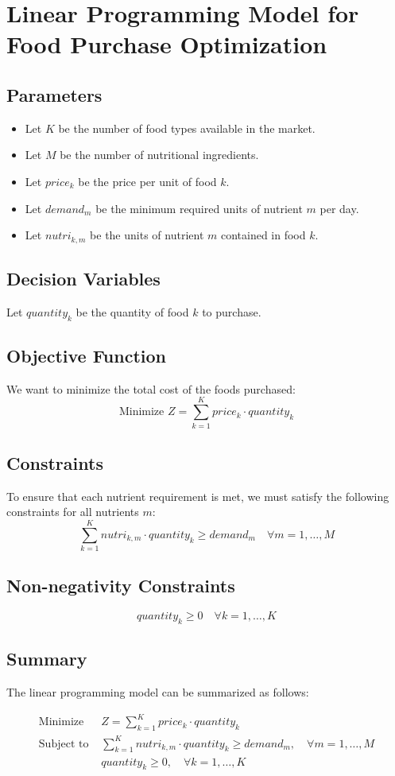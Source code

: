 \documentclass{article}
\begin{document}
\section*{Linear Programming Model for Food Purchase Optimization}

\subsection*{Parameters}
\begin{itemize}
    \item Let $K$ be the number of food types available in the market.
    \item Let $M$ be the number of nutritional ingredients.
    \item Let $price_k$ be the price per unit of food $k$.
    \item Let $demand_m$ be the minimum required units of nutrient $m$ per day.
    \item Let $nutri_{k,m}$ be the units of nutrient $m$ contained in food $k$.
\end{itemize}

\subsection*{Decision Variables}
Let $quantity_k$ be the quantity of food $k$ to purchase.

\subsection*{Objective Function}
We want to minimize the total cost of the foods purchased:
\[
\text{Minimize } Z = \sum_{k=1}^{K} price_k \cdot quantity_k
\]

\subsection*{Constraints}
To ensure that each nutrient requirement is met, we must satisfy the following constraints for all nutrients $m$:
\[
\sum_{k=1}^{K} nutri_{k,m} \cdot quantity_k \geq demand_m \quad \forall m = 1, \ldots, M
\]

\subsection*{Non-negativity Constraints}
\[
quantity_k \geq 0 \quad \forall k = 1, \ldots, K
\]

\subsection*{Summary}
The linear programming model can be summarized as follows:

\begin{align*}
\text{Minimize } & Z = \sum_{k=1}^{K} price_k \cdot quantity_k \\
\text{Subject to } & \sum_{k=1}^{K} nutri_{k,m} \cdot quantity_k \geq demand_m, \quad \forall m = 1, \ldots, M \\
                   & quantity_k \geq 0, \quad \forall k = 1, \ldots, K
\end{align*}
\end{document}

